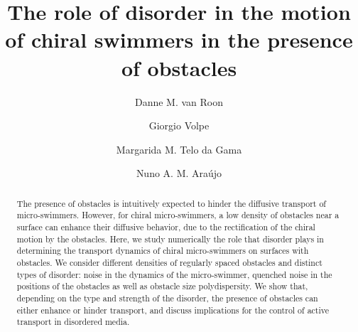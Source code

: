\documentclass[aps,pre,twocolumn,showpacs,superscriptaddress,amsmath,amssymb,longbibliography]{revtex4-2}
\begin{document}
\title{The role of disorder in the motion of chiral swimmers in the presence of obstacles}


 \author{Danne M. van Roon}
  \author{Giorgio Volpe}
  \author{Margarida M. Telo da Gama}
  \author{Nuno A. M. Ara\'ujo}


\begin{abstract}
The presence of obstacles is intuitively expected to hinder the diffusive transport of micro-swimmers. However, for chiral micro-swimmers, a low density of obstacles near a surface can enhance their diffusive behavior, due to the rectification of the chiral motion by the obstacles. Here, we study numerically the role that disorder plays in determining the transport dynamics of chiral micro-swimmers on surfaces with obstacles. We consider different densities of regularly spaced obstacles and distinct types of disorder: noise in the dynamics of the micro-swimmer, quenched noise in the positions of the obstacles as well as obstacle size polydispersity. We show that, depending on the type and strength of the disorder, the presence of obstacles can either enhance or hinder transport, and discuss implications for the control of active transport in disordered media.
\end{abstract}

\maketitle
\end{document}
